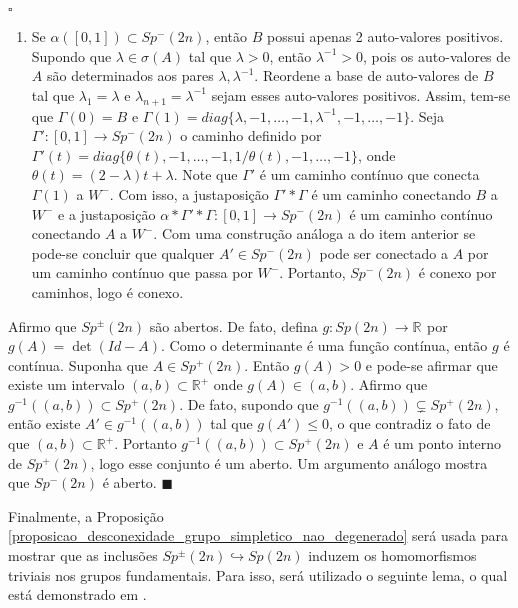 \documentclass[12pt]{book}
\newenvironment{prova}[1]{$\square$ #1}{\hfill$\blacksquare$}
\newcommand{\gruposimpletico}[1]{Sp(#1)}
\newcommand{\gruposimpleticonaodegenerado}[1]{Sp^{#1}(2n)}
\newcommand{\intervalo}{[0,1]}
\newcommand{\real}[1]{\mathbb{R}^{#1}}
\newcommand{\reta}{\real{}}
\begin{document}
\begin{prova}
\begin{enumerate}
			\item Se $\alpha([0,1]) \subset \gruposimpleticonaodegenerado{-}$, então $B$ possui apenas 2 auto-valores positivos. Supondo que $\lambda \in \sigma(A)$ tal que $\lambda > 0$, então $\lambda^{-1} > 0$, pois os auto-valores de $A$ são determinados aos pares $\lambda, \lambda^{-1}$. Reordene a base de auto-valores de $B$ tal que $\lambda_{1}=\lambda$ e $\lambda_{n+1}=\lambda^{-1}$ sejam esses auto-valores positivos. Assim, tem-se que $\Gamma(0) = B$ e $\Gamma(1) = diag\{\lambda, -1, \dots, -1, \lambda^{-1}, -1, \dots, -1\}$. Seja $\Gamma': \intervalo \to \gruposimpleticonaodegenerado{-}$ o caminho definido por $\Gamma'(t)=diag\{ \theta(t), -1,\dots, -1, 1/\theta(t) ,-1,\dots, -1\}$,
			onde $\theta(t)=(2- \lambda)t + \lambda$. Note que $\Gamma'$ é um caminho contínuo que conecta $\Gamma(1)$ a $W^{-}$. Com isso, a justaposição $\Gamma'*\Gamma$ é um caminho conectando $B$ a $W^{-}$ e a justaposição $\alpha * \Gamma'*\Gamma: \intervalo \to \gruposimpleticonaodegenerado{-}$ é um caminho contínuo conectando $A$ a $W^{-}$. Com uma construção análoga a do item anterior se pode-se concluir que qualquer $A' \in \gruposimpleticonaodegenerado{-}$ pode ser conectado a $A$ por um caminho contínuo que passa por $W^{-}$. Portanto, $\gruposimpleticonaodegenerado{-}$ é conexo por caminhos, logo é conexo.
		\end{enumerate}
		
		Afirmo que $\gruposimpleticonaodegenerado{\pm}$ são abertos. De fato, defina $g:\gruposimpletico{2n}\to \reta$ por $g(A) = \det(Id-A)$. Como o determinante é uma função contínua, então $g$ é contínua. Suponha que $A \in \gruposimpleticonaodegenerado{+}$. Então $g(A)>0$ e pode-se afirmar que existe um intervalo $(a,b) \subset \real{+}$ onde $g(A)\in (a,b)$. Afirmo que $g^{-1}((a,b))\subset \gruposimpleticonaodegenerado{+}$.  De fato, supondo que $g^{-1}((a,b)) \varsubsetneq \gruposimpleticonaodegenerado{+}$, então existe $A' \in g^{-1}((a,b))$ tal que $g(A')\leq 0$, o que contradiz o fato de que $(a,b) \subset \real{+}$. Portanto $g^{-1}((a,b)) \subset \gruposimpleticonaodegenerado{+}$ e $A$ é um ponto interno de $\gruposimpleticonaodegenerado{+}$, logo esse conjunto é um aberto. Um argumento análogo mostra que $\gruposimpleticonaodegenerado{-}$ é aberto.
	\end{prova}
	
	Finalmente, a Proposição \ref{proposicao_desconexidade_grupo_simpletico_nao_degenerado} será usada para mostrar que as inclusões $\gruposimpleticonaodegenerado{\pm} \hookrightarrow \gruposimpletico{2n}$ induzem os homomorfismos triviais nos grupos fundamentais. Para isso, será utilizado o seguinte lema, o qual está demonstrado em \cite{audi_floer_homology}.
	
\end{document}
